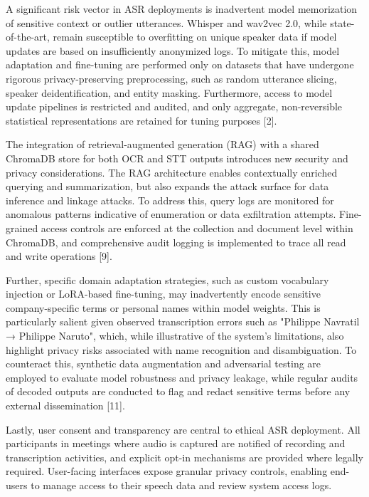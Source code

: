\documentclass[12pt,a4paper]{article}
\begin{document}
A significant risk vector in ASR deployments is inadvertent model memorization of sensitive context or outlier utterances. Whisper and wav2vec 2.0, while state-of-the-art, remain susceptible to overfitting on unique speaker data if model updates are based on insufficiently anonymized logs. To mitigate this, model adaptation and fine-tuning are performed only on datasets that have undergone rigorous privacy-preserving preprocessing, such as random utterance slicing, speaker deidentification, and entity masking. Furthermore, access to model update pipelines is restricted and audited, and only aggregate, non-reversible statistical representations are retained for tuning purposes [2].


The integration of retrieval-augmented generation (RAG) with a shared ChromaDB store for both OCR and STT outputs introduces new security and privacy considerations. The RAG architecture enables contextually enriched querying and summarization, but also expands the attack surface for data inference and linkage attacks. To address this, query logs are monitored for anomalous patterns indicative of enumeration or data exfiltration attempts. Fine-grained access controls are enforced at the collection and document level within ChromaDB, and comprehensive audit logging is implemented to trace all read and write operations [9].


Further, specific domain adaptation strategies, such as custom vocabulary injection or LoRA-based fine-tuning, may inadvertently encode sensitive company-specific terms or personal names within model weights. This is particularly salient given observed transcription errors such as "Philippe Navratil → Philippe Naruto", which, while illustrative of the system's limitations, also highlight privacy risks associated with name recognition and disambiguation. To counteract this, synthetic data augmentation and adversarial testing are employed to evaluate model robustness and privacy leakage, while regular audits of decoded outputs are conducted to flag and redact sensitive terms before any external dissemination [11].


Lastly, user consent and transparency are central to ethical ASR deployment. All participants in meetings where audio is captured are notified of recording and transcription activities, and explicit opt-in mechanisms are provided where legally required. User-facing interfaces expose granular privacy controls, enabling end-users to manage access to their speech data and review system access logs.
\end{document}
